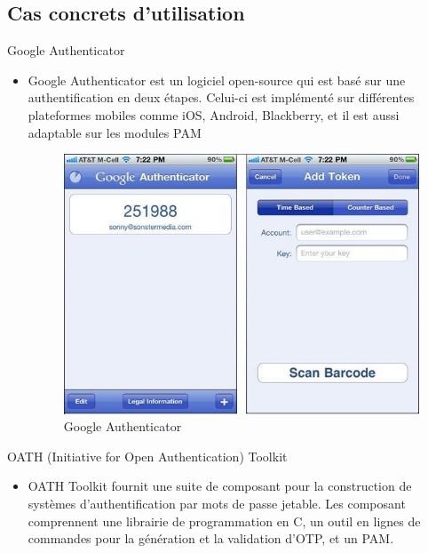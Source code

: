 \documentclass{../res/univ-projet}
\begin{document}
  \subsection{Cas concrets d'utilisation}
  Google Authenticator
  \begin{itemize}
    \item Google Authenticator est un logiciel open-source qui est basé sur une authentification en deux étapes. Celui-ci est implémenté sur différentes plateformes 
          mobiles comme iOS, Android, Blackberry, et il est aussi adaptable sur les modules PAM
          \begin{figure}[h!]
            \centerline{\includegraphics[scale=0.45]{GoogleAuthenticator_2.jpg}}
            \caption{Google Authenticator}
          \end{figure}  
  \end{itemize}
  \newpage
  OATH (Initiative for Open Authentication) Toolkit
  \begin{itemize}
    \item OATH Toolkit fournit une suite de composant pour la construction de systèmes d'authentification par mots de passe jetable. 
          Les composant comprennent une librairie de programmation en C, un outil en lignes de commandes pour la génération et la validation d'OTP, et un PAM.
  \end{itemize}
  
\end{document}
